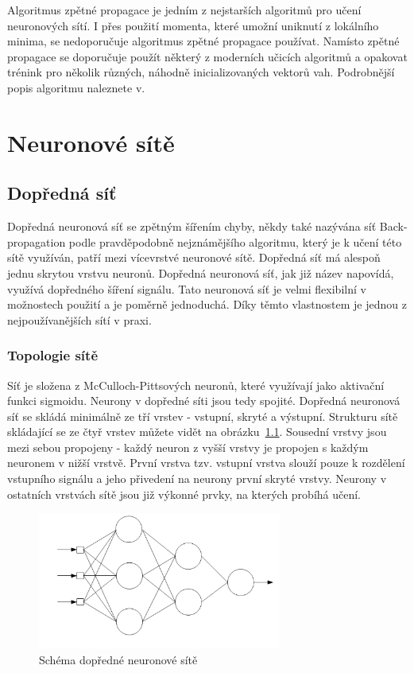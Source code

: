 \documentclass[11pt,twoside,a4paper]{book}
\begin{document}
Algoritmus zpětné propagace je jedním z nejstarších algoritmů pro učení neuronových sítí. I přes použití momenta, které umožní uniknutí z lokálního minima, se nedoporučuje algoritmus zpětné propagace používat. Namísto zpětné propagace se doporučuje použít některý z moderních učicích algoritmů a opakovat trénink pro několik různých, náhodně inicializovaných vektorů vah.\cite{nndocumentation} Podrobnější popis algoritmu naleznete v\citep{skripta}.
\chapter{Neuronové sítě}
\section{Dopředná síť}
Dopředná neuronová síť se zpětným šířením chyby, někdy také nazývána síť Back-propagation podle pravděpodobně nejznámějšího algoritmu, který je k učení této sítě využíván, patří mezi vícevrstvé neuronové sítě. Dopředná síť má alespoň jednu skrytou vrstvu neuronů. Dopředná neuronová síť, jak již název napovídá, využívá dopředného šíření signálu. Tato neuronová síť je velmi flexibilní v možnostech použití a je poměrně jednoduchá. Díky těmto vlastnostem je jednou z nejpoužívanějších sítí v praxi.

\subsection{Topologie sítě}
Síť je složena z McCulloch-Pittsových neuronů, které využívají jako aktivační funkci sigmoidu. Neurony v dopředné síti jsou tedy spojité. Dopředná neuronová síť se skládá minimálně ze tří vrstev - vstupní, skryté a výstupní. Strukturu sítě skládající se ze čtyř vrstev můžete vidět na obrázku~\ref{fig:ffschema}. Sousední vrstvy jsou mezi sebou propojeny - každý neuron z vyšší vrstvy je propojen s každým neuronem v nižší vrstvě. První vrstva tzv. vstupní vrstva slouží pouze k rozdělení vstupního signálu a jeho přivedení na neurony první skryté vrstvy. Neurony v ostatních vrstvách sítě jsou již výkonné prvky, na kterých probíhá učení.
\begin{figure}[!h]
\begin{center}
\includegraphics[height=4.5cm]{figures/ffschema.png}
\caption{Schéma dopředné neuronové sítě}
\label{fig:ffschema}
\end{center}
\end{figure}
\end{document}
